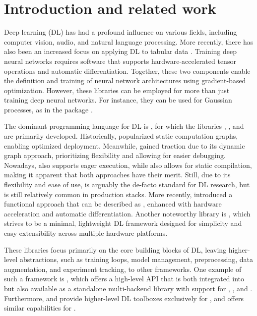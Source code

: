\documentclass[article]{jss}
\theoremstyle{definition}
\begin{document}
%
%
%
%
%

\section{Introduction and related work}

Deep learning (DL) has had a profound influence on various fields, including computer vision, audio, and natural language processing.
More recently, there has also been an increased focus on applying DL to tabular data \citep{ref-borisov2022deep}.
Training deep neural networks requires software that supports hardware-accelerated tensor operations and automatic differentiation.
Together, these two components enable the definition and training of neural network architectures using gradient-based optimization.
However, these libraries can be employed for more than just training deep neural networks. For instance, they can be used for Gaussian processes, as in the  package \citep{gardner2018gpytorch}.

The dominant programming language for DL is \python{} \citep{ref-van1995python}, for which the libraries \tensorflow{} \citep{ref-abadi2016tensorflow}, \pytorch{} \citep{ref-pytorch}, and  \citep{ref-jax2018github} are primarily developed.
Historically, \tensorflow{} popularized static computation graphs, enabling optimized deployment. Meanwhile, \pytorch{} gained traction due to its dynamic graph approach, prioritizing flexibility and allowing for easier debugging.
Nowadays, \tensorflow{} also supports eager execution, while \pytorch{} also allows for static compilation, making it apparent that both approaches have their merit.
Still, due to its flexibility and ease of use, \pytorch{} is arguably the de-facto standard for DL research, but \tensorflow{} is still relatively common in production stacks.
More recently,  introduced a functional approach that can be described as  \citep{ref-harris2020array}, enhanced with hardware acceleration and automatic differentiation.
Another noteworthy \python{} library is  \citep{ref-tinygrad}, which strives to be a minimal, lightweight DL framework designed for simplicity and easy extensibility across multiple hardware platforms.

These libraries focus primarily on the core building blocks of DL, leaving higher-level abstractions, such as training loops, model management, preprocessing, data augmentation, and experiment tracking, to other frameworks.
One example of such a framework is  \citep{ref-chollet2018keras}, which offers a high-level API that is both integrated into \tensorflow{} but also available as a standalone multi-backend library with support for \pytorch{}, \tensorflow{}, and . Furthermore,  \citep{ref-lightning2019} and  provide higher-level DL toolboxes exclusively for \pytorch{}, and  \citep{ref-flax} offers similar capabilities for .
\end{document}
